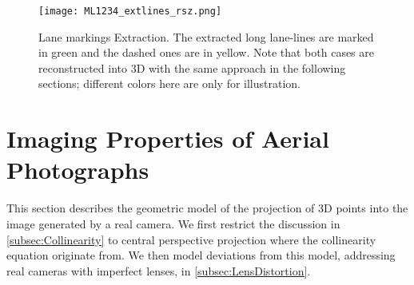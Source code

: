 \begin{figure}
  \centering
  \texttt{[image: ML1234\_extlines\_rsz.png]}
  \caption{\small Lane markings Extraction. The extracted long lane-lines are marked in green and the dashed ones are in yellow.  Note that both cases are reconstructed into 3D with the same approach in the following sections; different colors here are only for illustration.}
  \label{fig:LineExtraction}
\end{figure}





\section{Imaging Properties of Aerial Photographs}
\label{sec:Geometry}

This section describes the geometric model of the projection of 3D points into the image generated by a real camera. We first restrict the discussion in \cref{subsec:Collinearity} to central perspective projection where the collinearity equation originate from. We then model deviations from this model, addressing real cameras with imperfect lenses, in \cref{subsec:LensDistortion}.

